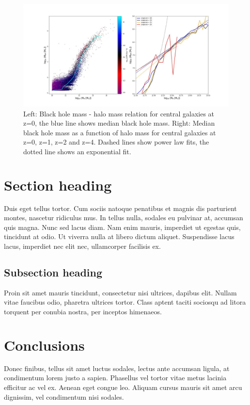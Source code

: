 \documentclass[12pt, onecolumn]{revtex4}    %
\begin{document}
\begin{figure}[H]
\centering
\includegraphics[width=17cm]{Plot_3.jpeg}
\caption{Left: Black hole mass - halo mass relation for central galaxies at z=0, the blue line shows median black hole mass. Right: Median black hole mass as a function of halo mass for central galaxies at z=0, z=1, z=2 and z=4. Dashed lines show power law fits, the dotted line shows an exponential fit.}
\label{fig:3}
\end{figure}

\section{Section heading}

Duis eget tellus tortor. Cum sociis natoque penatibus et magnis dis parturient montes, nascetur ridiculus mus. In tellus nulla, sodales eu pulvinar at, accumsan quis magna. Nunc sed lacus diam. Nam enim mauris, imperdiet ut egestas quis, tincidunt at odio. Ut viverra nulla at libero dictum aliquet. Suspendisse lacus lacus, imperdiet nec elit nec, ullamcorper facilisis ex.

\subsection{Subsection heading}

Proin sit amet mauris tincidunt, consectetur nisi ultrices, dapibus elit. Nullam vitae faucibus odio, pharetra ultrices tortor. Class aptent taciti sociosqu ad litora torquent per conubia nostra, per inceptos himenaeos. 

\section{Conclusions}
Donec finibus, tellus sit amet luctus sodales, lectus ante accumsan ligula, at condimentum lorem justo a sapien. Phasellus vel tortor vitae metus lacinia efficitur ac vel ex. Aenean eget congue leo. Aliquam cursus mauris sit amet arcu dignissim, vel condimentum nisi sodales. 
\end{document}
